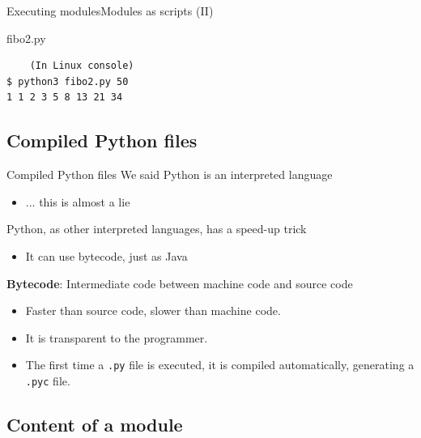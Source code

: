 \documentclass[10pt,compress]{beamer} %
\begin{document}
\begin{frame}{Executing modules}{Modules as scripts (II)}
	\vspace{-0.3cm}
	\begin{exampleblock}{fibo2.py}
	\vspace{-0.2cm}
	
	\vspace{-0.2cm}
	\end{exampleblock}

	\begin{exampleblock}{}
	\vspace{-0.2cm}
	\begin{verbatim}
    (In Linux console)
$ python3 fibo2.py 50
1 1 2 3 5 8 13 21 34
\end{verbatim}
	\vspace{-0.2cm}
	\end{exampleblock}
\end{frame}

\subsection{Compiled Python files}
\begin{frame}{Compiled Python files}{}
	We said Python is an interpreted language
		\begin{itemize}
		\item ... this is almost a lie
		\end{itemize}
	Python, as other interpreted languages, has a speed-up trick
		\begin{itemize}
		\item It can use bytecode, just as Java
		\end{itemize}
	\textbf{Bytecode}: Intermediate code between machine code and source code
		\begin{itemize}
		\item Faster than source code, slower than machine code.
		\item It is transparent to the programmer.
		\item The first time a \texttt{.py} file is executed, it is compiled automatically, generating a \texttt{.pyc} file.
		\end{itemize}
\end{frame}

\subsection{Content of a module}
\end{document}
